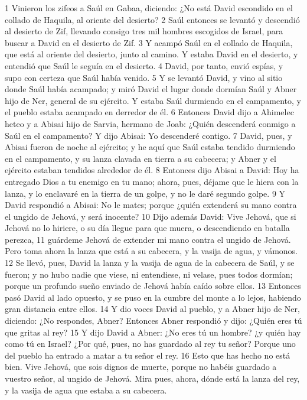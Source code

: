 1 Vinieron los zifeos a Saúl en Gabaa, diciendo: ¿No está David escondido en el collado de Haquila, al oriente del desierto? 
2 Saúl entonces se levantó y descendió al desierto de Zif, llevando consigo tres mil hombres escogidos de Israel, para buscar a David en el desierto de Zif.
3 Y acampó Saúl en el collado de Haquila, que está al oriente del desierto, junto al camino. Y estaba David en el desierto, y entendió que Saúl le seguía en el desierto.
4 David, por tanto, envió espías, y supo con certeza que Saúl había venido.
5 Y se levantó David, y vino al sitio donde Saúl había acampado; y miró David el lugar donde dormían Saúl y Abner hijo de Ner, general de su ejército. Y estaba Saúl durmiendo en el campamento, y el pueblo estaba acampado en derredor de él.
6 Entonces David dijo a Ahimelec heteo y a Abisai hijo de Sarvia, hermano de Joab: ¿Quién descenderá conmigo a Saúl en el campamento? Y dijo Abisai: Yo descenderé contigo.
7 David, pues, y Abisai fueron de noche al ejército; y he aquí que Saúl estaba tendido durmiendo en el campamento, y su lanza clavada en tierra a su cabecera; y Abner y el ejército estaban tendidos alrededor de él.
8 Entonces dijo Abisai a David: Hoy ha entregado Dios a tu enemigo en tu mano; ahora, pues, déjame que le hiera con la lanza, y lo enclavaré en la tierra de un golpe, y no le daré segundo golpe.
9 Y David respondió a Abisai: No le mates; porque ¿quién extenderá su mano contra el ungido de Jehová, y será inocente?
10 Dijo además David: Vive Jehová, que si Jehová no lo hiriere, o su día llegue para que muera, o descendiendo en batalla perezca,
11 guárdeme Jehová de extender mi mano contra el ungido de Jehová. Pero toma ahora la lanza que está a su cabecera, y la vasija de agua, y vámonos.
12 Se llevó, pues, David la lanza y la vasija de agua de la cabecera de Saúl, y se fueron; y no hubo nadie que viese, ni entendiese, ni velase, pues todos dormían; porque un profundo sueño enviado de Jehová había caído sobre ellos.
13 Entonces pasó David al lado opuesto, y se puso en la cumbre del monte a lo lejos, habiendo gran distancia entre ellos.
14 Y dio voces David al pueblo, y a Abner hijo de Ner, diciendo: ¿No respondes, Abner? Entonces Abner respondió y dijo: ¿Quién eres tú que gritas al rey?
15 Y dijo David a Abner: ¿No eres tú un hombre? ¿y quién hay como tú en Israel? ¿Por qué, pues, no has guardado al rey tu señor? Porque uno del pueblo ha entrado a matar a tu señor el rey.
16 Esto que has hecho no está bien. Vive Jehová, que sois dignos de muerte, porque no habéis guardado a vuestro señor, al ungido de Jehová. Mira pues, ahora, dónde está la lanza del rey, y la vasija de agua que estaba a su cabecera.
